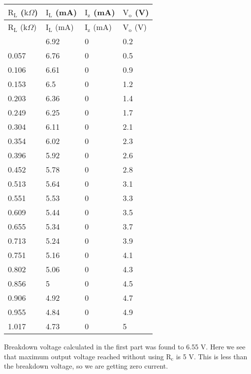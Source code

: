 \documentclass[12pt]{article}
\begin{document}
\begin{longtable}{|l|l|l|l|}
\hline
$\mathrm{R_L}$ ($\mathrm{k}\Omega$) & $\mathrm{I_L}$ (mA) & $\text{I}_\text{z}$ (mA) & $\mathrm{V_o}$ (V) \\ \hline \hline
\endfirsthead
\hline
$\mathrm{R_L}$ ($\mathrm{k}\Omega$) & $\mathrm{I_L}$ (mA) & $\text{I}_\text{z}$  (mA) & $\mathrm{V_o}$ (V) \\ \hline \hline
\endhead
\hline
\endfoot
\hline
\endlastfoot
0.007       & 6.92      & 0       & 0.2       \\ \hline
0.057       & 6.76      & 0       & 0.5       \\ \hline
0.106       & 6.61      & 0       & 0.9       \\ \hline
0.153       & 6.5       & 0       & 1.2       \\ \hline
0.203       & 6.36      & 0       & 1.4       \\ \hline
0.249       & 6.25      & 0       & 1.7       \\ \hline
0.304       & 6.11      & 0       & 2.1       \\ \hline
0.354       & 6.02      & 0       & 2.3       \\ \hline
0.396       & 5.92      & 0       & 2.6       \\ \hline
0.452       & 5.78      & 0       & 2.8       \\ \hline
0.513       & 5.64      & 0       & 3.1       \\ \hline
0.551       & 5.53      & 0       & 3.3       \\ \hline
0.609       & 5.44      & 0       & 3.5       \\ \hline
0.655       & 5.34      & 0       & 3.7       \\ \hline
0.713       & 5.24      & 0       & 3.9       \\ \hline
0.751       & 5.16      & 0       & 4.1       \\ \hline
0.802       & 5.06      & 0       & 4.3       \\ \hline
0.856       & 5         & 0       & 4.5       \\ \hline
0.906       & 4.92      & 0       & 4.7       \\ \hline
0.955       & 4.84      & 0       & 4.9       \\ \hline
1.017       & 4.73      & 0       & 5         \\ \hline
\end{longtable}
\noindent
Breakdown voltage calculated in the first part was found to 6.55 V. Here we see that maximum output voltage reached without using \( \mathrm{R_c}\) is 5 V. This is less than the breakdown voltage, so  we are getting zero current.\\[0.3cm]
\end{document}
